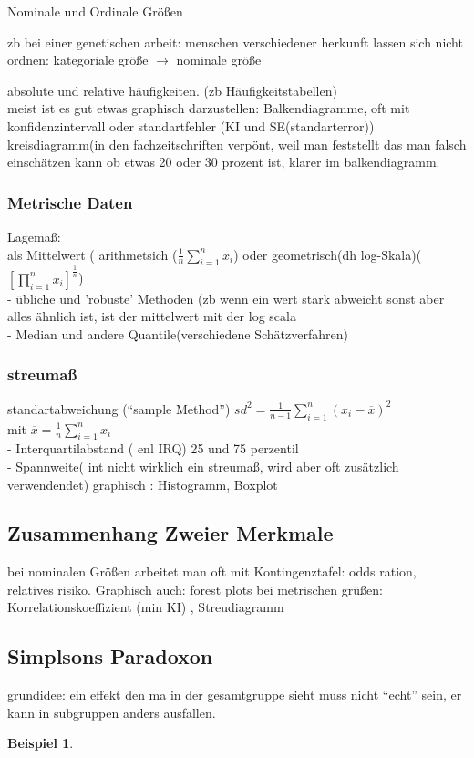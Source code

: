 \documentclass[a4paper]{article}
\theoremstyle{definition}
\newtheorem{beispiel}{Beispiel}%
\theoremstyle{remark}
\begin{document}
Nominale und Ordinale Größen

zb bei einer genetischen arbeit: menschen verschiedener herkunft lassen sich nicht ordnen: kategoriale größe $ \rightarrow $  nominale größe 

absolute und relative häufigkeiten. (zb Häufigkeitstabellen)\\
meist ist es gut etwas graphisch  darzustellen: Balkendiagramme, oft mit konfidenzintervall oder standartfehler (KI und SE(standarterror))
kreisdiagramm(in den fachzeitschriften verpönt, weil man feststellt das man falsch einschätzen kann ob etwas 20 oder 30 prozent ist, klarer im balkendiagramm.
\subsubsection{Metrische Daten}
\label{sub:metrische_daten}

Lagemaß:\\
als Mittelwert ( arithmetsich ($ \frac{1}{n}\sum_{i=1}^{n}x_i$) oder geometrisch(dh log-Skala)($ \left[ \prod_{i=1}^{n}x_i \right]^{\frac{1}{n}}$)\\
- übliche und 'robuste' Methoden (zb wenn ein wert stark abweicht sonst aber alles ähnlich ist, ist der mittelwert mit der log scala \\
  - Median und andere Quantile(verschiedene Schätzverfahren) 
\subsubsection{streumaß}
\label{ssub:streumass}

standartabweichung (``sample Method'') $ sd^2= \frac{1}{n-1}\sum_{i=1}^{n}(x_i-\overline{x})^2$\\
mit $ \overline{x}=\frac{1}{n}\sum_{i=1}^{n}x_i$\\
- Interquartilabstand ( enl IRQ) 25 und 75 perzentil\\
- Spannweite( int nicht wirklich ein streumaß, wird aber oft zusätzlich verwendendet)
graphisch : Histogramm, Boxplot
\subsection{Zusammenhang Zweier Merkmale}
\label{sub:zusammenhang_zweier_merkmale}

bei nominalen Größen arbeitet man oft mit Kontingenztafel: odds ration, relatives risiko. Graphisch auch: forest plots
bei metrischen grüßen: Korrelationskoeffizient (min KI) , Streudiagramm
\subsection{Simplsons Paradoxon}
\label{sub:simplsons_paradoxon}

grundidee: ein effekt den ma in der gesamtgruppe sieht muss nicht ``echt'' sein, er kann in subgruppen anders ausfallen.
\begin{beispiel}
\end{beispiel}
\end{document}
